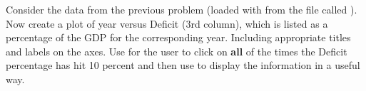 {Consider the data from the previous problem (loaded with  from the file called ).  Now create a plot of year versus Deficit (3rd column), which is listed as a percentage of the GDP for the corresponding year.  Including appropriate titles and labels on the axes.  Use  for the user to click on {\bf all} of the times the Deficit percentage has hit 10 percent and then use  to display the information in a useful way.}
{}
